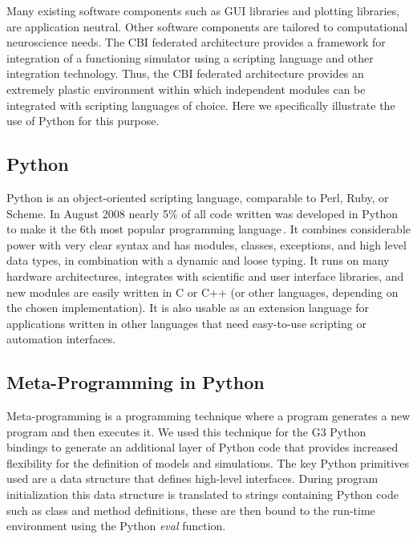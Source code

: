 \documentclass[12pt]{article}
\begin{document}
Many existing software components such as GUI libraries and plotting
libraries, are application neutral.  Other software components are
tailored to computational neuroscience needs.  The CBI federated
architecture provides a framework for integration of a functioning
simulator using a scripting language and other integration technology.
Thus, the CBI federated architecture provides an extremely plastic
environment within which independent modules can be integrated with
scripting languages of choice.  Here we specifically illustrate the
use of Python for this purpose.

\subsection{Python}

Python is an object-oriented scripting language, comparable to Perl,
Ruby, or Scheme.  In August 2008 nearly 5\% of all code written was
developed in Python to make it the 6th most popular programming
language\,\cite{software09:_tiobe_progr_commun_index}. It combines
considerable power with very clear syntax and has modules, classes,
exceptions, and high level data types, in combination with a dynamic
and loose typing. It runs on many hardware architectures, integrates
with scientific and user interface libraries, and new modules are
easily written in C or C++ (or other languages, depending on the
chosen implementation). It is also usable as an extension language for
applications written in other languages that need easy-to-use
scripting or automation interfaces.


\subsection{Meta-Programming in Python}

Meta-programming is a programming technique where a program generates
a new program and then executes it.  We used this technique for the G3
Python bindings to generate an additional layer of Python code that
provides increased flexibility for the definition of models and
simulations.  The key Python primitives used are a data structure that
defines high-level interfaces.  During program initialization this
data structure is translated to strings containing Python code such as
class and method definitions, these are then bound to the run-time
environment using the Python {\it eval} function.
\end{document}
